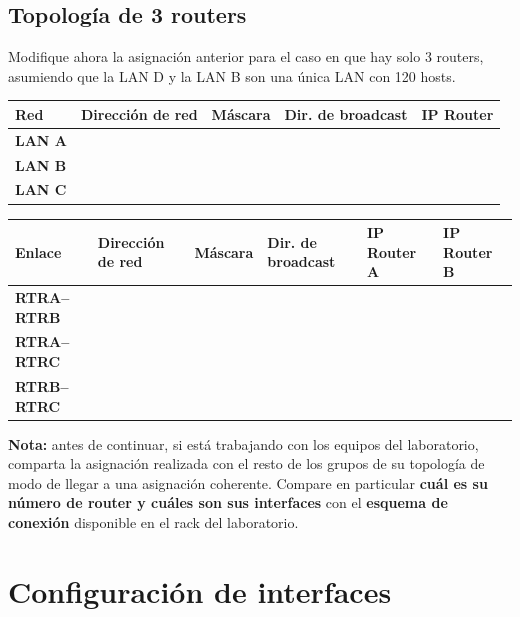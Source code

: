 \documentclass[a4paper,10pt]{article}
\begin{document}
\subsection{Topología de 3 routers}

    Modifique ahora la asignación anterior para el caso en que hay solo 3 routers, asumiendo que la LAN D y la LAN B son una única LAN con 120 hosts.

        \begin{center}
        \bigskip
        \begin{tabular}{|p{1cm}|p{3cm}|p{3cm}|p{3cm}|p{3cm}|}
            \hline
            \textbf{Red} & \textbf{Dirección de red} & \textbf{Máscara} & \textbf{Dir. de broadcast} & \textbf{IP Router} \\ \hline
            \textbf{LAN A} & & & & \\ \hline
            \textbf{LAN B} & & & & \\ \hline
            \textbf{LAN C} & & & & \\ \hline
        \end{tabular}
    \end{center}

    \bigskip
    \begin{center}
        \begin{tabular}{|p{2cm}|p{2.5cm}|p{2.5cm}|p{2.6cm}|p{2.4cm}|p{2.4cm}|}
            \hline
            \textbf{Enlace} & \textbf{Dirección de red} & \textbf{Máscara} & \textbf{Dir. de broadcast} & \textbf{IP Router A} & \textbf{IP Router B} \\ \hline
            \textbf{RTRA--RTRB} & & & & & \\ \hline
            \textbf{RTRA--RTRC} & & & & & \\ \hline
            \textbf{RTRB--RTRC} & & & & & \\ \hline
        \end{tabular}
    \bigskip
    \end{center}


\textbf{Nota:} antes de continuar, si está trabajando con los equipos del laboratorio, comparta la asignación realizada con el resto de los grupos de su topología de modo de llegar a una asignación coherente. Compare en particular \textbf{cuál es su número de router y cuáles son sus interfaces} con el \textbf{esquema de conexión} disponible en el rack del laboratorio.

\section{Configuración de interfaces}
\end{document}
